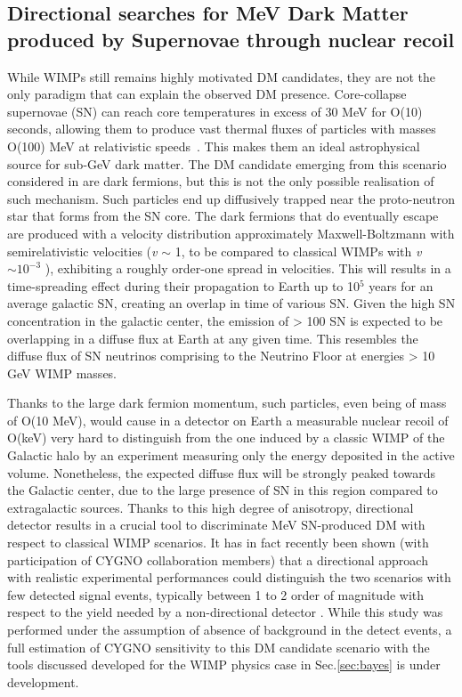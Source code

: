 \documentclass[physics,article,submit,moreauthors,pdftex]{Definitions/mdpi}
\begin{document}
\subsection{Directional searches for MeV Dark Matter produced by Supernovae through nuclear recoil}
While WIMPs still remains highly motivated DM candidates, they are not the only paradigm that can explain the observed DM presence. Core-collapse supernovae (SN) can reach core temperatures in excess of 30 MeV for O(10) seconds, allowing them to produce vast thermal fluxes of particles with masses O(100) MeV at relativistic speeds~\cite{DeRocco:2019jti}. This makes them an ideal astrophysical source for sub-GeV dark matter. The DM candidate emerging from this scenario considered in \cite{DeRocco:2019jti} are dark fermions, but this is not the only possible realisation of such mechanism. Such particles end up diffusively trapped near the proto-neutron star that forms from the SN core. The dark fermions that do eventually escape are produced with a velocity distribution approximately Maxwell-Boltzmann with semirelativistic velocities ({\it v} $\sim$ 1, to be compared to classical WIMPs with {\it v} $\sim 10^{-3}$  ), exhibiting a roughly order-one spread in velocities. This will results in a time-spreading effect during their propagation to Earth up to 10$^5$ years for an average galactic SN, creating an overlap in time of various SN. Given the high SN concentration in the galactic center, the emission of > 100 SN is expected to be overlapping in a diffuse flux at Earth at any given time. This resembles the diffuse flux of SN neutrinos comprising to the Neutrino Floor at energies > 10 GeV WIMP masses.


Thanks to the large dark fermion momentum, such particles, even being of mass of O(10 MeV), would cause in a detector on Earth a measurable nuclear recoil of O(keV) very hard to distinguish from the one induced by a classic WIMP of the Galactic halo by an experiment measuring only the energy deposited in the active volume. Nonetheless, the expected diffuse flux will be strongly peaked towards the Galactic center, due to the large presence of SN in this region compared to extragalactic sources. Thanks to this high degree of anisotropy, directional detector results in a crucial tool to discriminate MeV SN-produced DM with respect to classical WIMP scenarios. It has in fact recently been shown (with participation of CYGNO collaboration members) that a directional approach with realistic experimental performances could distinguish the two scenarios with few detected signal events, typically between 1 to 2 order of magnitude with respect to the yield needed by a non-directional detector \cite{Baracchini:2020owr}. While this study was performed under the assumption of absence of background in the detect events, a full estimation of CYGNO sensitivity to this DM candidate scenario with the tools discussed developed for the WIMP physics case in Sec.\ref{sec:bayes} is under development.
\end{document}
